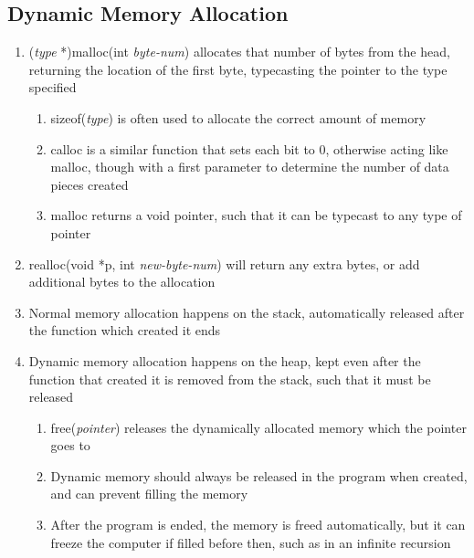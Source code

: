 \documentclass[11 pt, twoside]{article}
\begin{document}
\subsection{Dynamic Memory Allocation}
\begin{enumerate}
\item (\textit{type} *)malloc(int \textit{byte-num}) allocates that number of bytes from the head, returning the location of the first byte, typecasting the pointer to the type specified
\begin{enumerate}
\item sizeof(\textit{type}) is often used to allocate the correct amount of memory
\item calloc is a similar function that sets each bit to 0, otherwise acting like malloc, though with a first parameter to determine the number of data pieces created
\item malloc returns a void pointer, such that it can be typecast to any type of pointer
\end{enumerate}
\item realloc(void *p, int \textit{new-byte-num}) will return any extra bytes, or add additional bytes to the allocation
\item Normal memory allocation happens on the stack, automatically released after the function which created it ends
\item Dynamic memory allocation happens on the heap, kept even after the function that created it is removed from the stack, such that it must be released
\begin{enumerate}
\item free(\textit{pointer}) releases the dynamically allocated memory which the pointer goes to
\item Dynamic memory should always be released in the program when created, and can prevent filling the memory
\item After the program is ended, the memory is freed automatically, but it can freeze the computer if filled before then, such as in an infinite recursion
\end{enumerate}
\end{enumerate}
\end{document}
